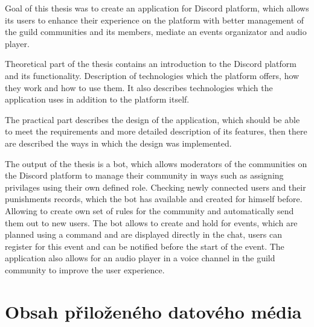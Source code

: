 \documentclass[
  program=inf,
biblatex=false,
sourcecodes=true,
joinlists=true,
  figures=true,
  tables=true,
  glossaries=true,
  index=false
]{kidiplom}
\begin{document}
\begin{kiconclusions}[english]
Goal of this thesis was to create an application for Discord platform, which allows its users to enhance their
experience on the platform with better management of the guild communities and its members, mediate an events organizator and
audio player.

Theoretical part of the thesis contains an introduction to the Discord platform and its functionality. Description of technologies
which the platform offers, how they work and how to use them. It also describes technologies which the application uses
in addition to the platform itself.

The practical part describes the design of the application, which should be able to meet the requirements and more
detailed description of its features, then there are described the ways in which the design was implemented.

The output of the thesis is a bot, which allows moderators of the communities on the Discord platform to manage their
community in ways such as assigning privilages using their own defined role. Checking newly connected users and their
punishments records, which the bot has available and created for himself before. Allowing to create own set of rules for the community and
automatically send them out to new users. The bot allows to create and hold for events, which are planned using a
command and are displayed directly in the chat, users can register for this event and
can be notified before the start of the event. The application also allows for an audio player in a voice channel in the
guild community to improve the user experience.
\end{kiconclusions}

\appendix

\section{Obsah přiloženého datového média} \label{sec:ObsahMedia}
\end{document}
